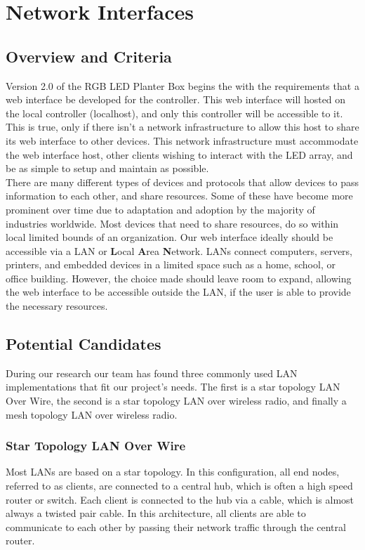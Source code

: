 \section{Network Interfaces}

	\subsection{Overview and Criteria}
	Version 2.0 of the RGB LED Planter Box begins the with the requirements that a web interface be developed for the controller.
	This web interface will hosted on the local controller (localhost), and only this controller will be accessible to it.
	This is true, only if there isn't a network infrastructure to allow this host to share its web interface to other devices.
	This network infrastructure must accommodate the web interface host, other clients wishing to interact with the LED array, and
	be as simple to setup and maintain as possible.  \\

	There are many different types of devices and protocols that allow devices to pass information to each other, and share resources.
	Some of these have become more prominent over time due to adaptation and adoption by the majority of industries worldwide.
	Most devices that need to share resources, do so within local limited bounds of an organization.
	Our web interface ideally should be accessible via a LAN or \textbf{L}ocal \textbf{A}rea \textbf{N}etwork.
	LANs connect computers, servers, printers, and embedded devices in a limited space such as a home, school, or office building. \cite{LAN1}
	However, the choice made should leave room to expand, allowing the web interface to be accessible outside the LAN, if the user is able to provide the necessary resources.

	\subsection{Potential Candidates}
	During our research our team has found three commonly used LAN implementations that fit our project's needs.
	The first is a star topology LAN Over Wire, the second is a star topology LAN over wireless radio, and finally a mesh topology LAN over wireless radio.

	\subsubsection{Star Topology LAN Over Wire}
	Most LANs are based on a star topology.  In this configuration, all end nodes, referred to as clients, are connected to a central hub, which is often a high speed router or switch.
	Each client is connected to the hub via a cable, which is almost always a twisted pair cable.\cite{LAN2}
	In this architecture, all clients are able to communicate to each other by passing their network traffic through the central router.

